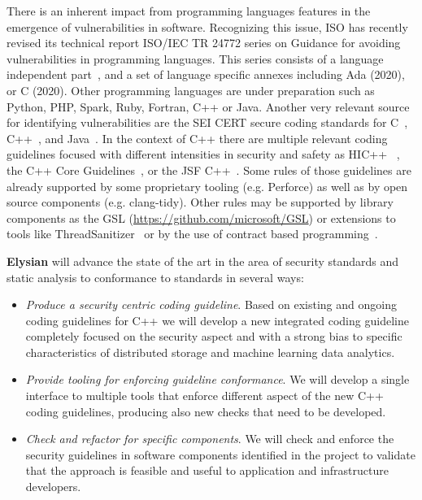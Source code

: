 \documentclass[a4paper,11pt]{article}
\newcommand{\project}[1]{\textbf{#1}\xspace}
\newcommand{\SECURITY}{\project{Elysian}}
\newcommand{\TheProject}{\SECURITY}
\begin{document}
There is an inherent impact from programming languages features in the
emergence of vulnerabilities in software. Recognizing this issue, ISO has
recently revised its technical report ISO/IEC  TR 24772 series on Guidance for 
avoiding vulnerabilities in programming languages. This series consists of a
language independent part~\cite{iso24772:1}, and a set of language specific
annexes including Ada (2020), or C (2020). Other programming languages are
under preparation such as Python, PHP, Spark, Ruby, Fortran, C++ or Java.
Another very relevant source for identifying vulnerabilities are the SEI CERT
secure coding standards for C~\cite{cert:c}, C++~\cite{cert:cpp}, and
Java~\cite{cert:java}. In the context of C++ there are multiple relevant coding
guidelines focused with different intensities in security and safety as
HIC++~\cite{hicpp} , the C++ Core Guidelines~\cite{cpp:core-guidelines}, or the
JSF C++~\cite{cpp:jsf}. Some rules of those guidelines are already supported by
some proprietary tooling (e.g.  Perforce) as well as by open source components
(e.g.  clang-tidy).  Other rules may be supported by library components as the
GSL (\url{https://github.com/microsoft/GSL}) or extensions to tools like 
ThreadSanitizer~\cite{dolz:2017}
or by the use of contract based programming~\cite{lopez-gomez:2019}.

\begin{mdframed}[backgroundcolor=gray!10]
\TheProject{} will advance the state of the art in the area of security standards and static analysis to conformance to standards in several ways:
\begin{itemize}
\item \emph{Produce a security centric coding guideline}. 
Based on existing and ongoing coding guidelines for C++ we will develop a new
integrated coding guideline completely focused on the security aspect and with
a strong bias to specific characteristics of distributed storage and machine
learning data analytics.

\item \emph{Provide tooling for enforcing guideline conformance}. 
We will develop a single interface to multiple tools that enforce different aspect
of the new C++ coding guidelines, producing also new checks that need to be developed.

\item \emph{Check and refactor for specific components}. 
We will check and enforce the security guidelines in software components identified
in the project to validate that the approach is feasible and useful to
application and infrastructure developers. 

\end{itemize}
\end{mdframed}
\end{document}
